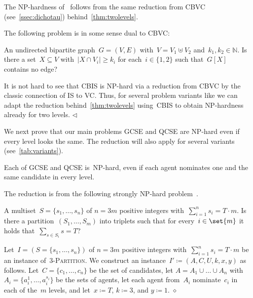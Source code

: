\documentclass[10pt,a4paper,twocolumn]{article}
\theoremstyle{plain}
\theoremstyle{definition}
\theoremstyle{remark}
\newcommand{\cqed}{\hfill$\diamond$}
\newcommand{\rqed}{\hfill$\triangleleft$}
\newcommand{\prob}[1]{\textnormal{\textsc{#1}}}
\newcommand{\N}{\mathds{N}}
\newcommand{\cocl}[1]{\textrm{#1}}
\newcommand{\NP}{\cocl{NP}}
\newcommand{\ceq}{\coloneqq}
\newcommand{\smlaAcr}{\prob{GCSE}}
\newcommand{\fmlaAcr}{\prob{QCSE}}
\begin{document}
{{  The \NP-hardness of~\bicmce[$=$][$\geq$][$\geq$]{\ourOWA,\ourPREF}
  follows from the same reduction
  from CBVC
  (see~\cref{ssec:dichotau}) 
  behind~\cref{thm:twolevels}.

  \begin{remark}
    The following problem is in some sense dual to CBVC: 

    {An undirected bipartite graph~$G=(V,E)$ with~$V=V_1\uplus V_2$ and~$k_1,k_2\in\N$.}
    {Is there a set~$X\subseteq V$ with~$|X\cap V_i|\geq k_i$ for each~$i\in\{1,2\}$ such that~$G[X]$ contains no edge?}
    
    It is not hard to see that CBIS is \NP-hard via a reduction from CBVC
    by the classic connection of IS to VC.
    Thus, 
    for several problem variants like \bicmce[$\geq$][$\geq$][$\leq$]{\ourOWA,\ourPREF}
    we can adapt the reduction behind~\cref{thm:twolevels}
    using~CBIS to obtain
    \NP-hardness already for two levels.
    \rqed
  \end{remark}

  We next prove that our main problems 
  \smlaAcr{} and \fmlaAcr{} are \NP-hard even if every level looks the same.
  The reduction will also apply for several variants
  (see~\cref{tab:variants}).

  \begin{proposition}\label{prop:3part}
    Each of \smlaAcr{} and \fmlaAcr{}
    is~\NP-hard,
    even if each agent nominates one and the same candidate in every level.
  \end{proposition}
  
  The reduction is from the following strongly \NP-hard problem~\cite{GareyJ79}.

  {A multiset~$S=\{s_1,\dots,s_n\}$ of $n=3m$ positive integers with~$\sum_{i=1}^n s_i = T\cdot m$.}
  {Is there a partition~$(S_1,\dots,S_m)$ into triplets such that for every~$i\in\set{m}$ it holds that~$\sum_{s\in S_i} s = T$?}

  \begin{construction}
    \label{constr:3part}
    Let~$I=(S=\{s_1,\dots,s_n\})$ of $n=3m$ positive integers with~$\sum_{i=1}^n s_i = T\cdot m$
    be an instance of~\textsc{3-Partition}.
    We construct an instance~$I'\ceq (A,C,U,k,x,y)$ as follows.
    Let~$C=\{c_1,\dots,c_n\}$ be the set of candidates,
    let $A=A_1\cup\dots\cup A_n$ with~$A_i=\{a_i^1,\dots,a_i^{s{_i}}\}$
    be the sets of agents,
    let each agent from~$A_i$ nominate~$c_i$ in each of the~$m$ levels,
    and let~$x\ceq T$, 
    $k\ceq 3$, and 
    $y\ceq 1$.
    \cqed
  \end{construction}

}}
\end{document}
